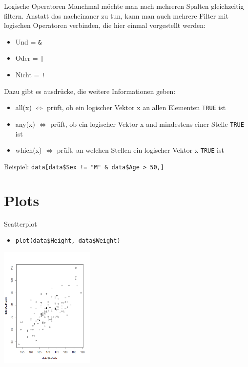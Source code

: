 \documentclass[aspectratio = 169]{chariteBeamer}
\begin{document}
\begin{frame}[fragile]{Logische Operatoren}
Manchmal möchte man nach mehreren Spalten gleichzeitig filtern. Anstatt das nacheinaner zu tun, kann man auch mehrere Filter mit logischen Operatoren verbinden, die hier einmal vorgestellt werden: \\
\begin{itemize}
			\item  Und = \verb+&+
			\item  Oder = \verb+|+
			\item Nicht = \verb+!+
\end{itemize}
Dazu gibt es ausdrücke, die weitere Informationen geben:
\begin{itemize}
			\item all(x) $\Leftrightarrow$ prüft, ob ein logischer Vektor x an allen Elementen \verb+TRUE+ ist
			\item any(x) $\Leftrightarrow$ prüft, ob ein logischer Vektor x and mindestens einer Stelle \verb+TRUE+ ist
			\item which(x) $\Leftrightarrow$ prüft, an welchen Stellen ein logischer Vektor x \verb+TRUE+ ist
\end{itemize}
Beispiel:  \verb+data[data$Sex != "M" & data$Age > 50,]+
\end{frame}


\section{Plots}

\begin{frame}[fragile]{Scatterplot}
	\begin{itemize}
		\item \verb+plot(data$Height, data$Weight)+
	\end{itemize}
			
	\begin{center}
		\includegraphics[height=6cm]{Scatterplot}
	\end{center}
\end{frame}
\end{document}

